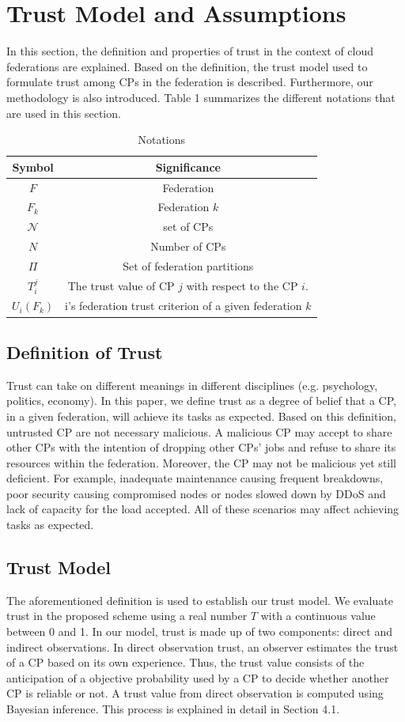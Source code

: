 \documentclass[preprint]{elsarticle}
\theoremstyle{definition}
\theoremstyle{remark}
\theoremstyle{property}
\begin{document}
\section{Trust Model and Assumptions}

In this section, the definition and properties of trust in the context of cloud federations are explained. Based on the definition, the trust model used to formulate trust among CPs in the federation is described. Furthermore, our methodology is also introduced. Table 1 summarizes the different notations that are used in this section.

\begin{table}[!ht]
\caption{Notations}
\centering
\begin{tabular}{|c c|}
\hline
Symbol & Significance \\
\hline
$F$ & Federation \\
$F_{k}$ & Federation $k$\\
$\mathcal{N}$ & set of CPs \\
$N$ & Number of CPs \\
$\Pi$ & Set of federation partitions \\
$T_{i}^{j}$ & The trust value of CP $j$ with respect to the CP $i$.  \\
$U_{i}(F_{k})$ & i's federation trust criterion of a given federation $k$ \\
\hline
\end{tabular}
\end{table}

\subsection{Definition of Trust}
Trust can take on different meanings in different disciplines (e.g. psychology, politics, economy). In this paper, we define trust as a degree of belief that a CP, in a given federation, will achieve its tasks as expected. Based on this definition, untrusted CP are not necessary malicious. A malicious CP may accept to share other CPs with the intention of dropping other CPs’ jobs and refuse to share its resources within the federation. Moreover, the CP may not be malicious yet still deficient. For example, inadequate maintenance causing frequent breakdowns, poor security causing compromised nodes or nodes slowed down by DDoS and lack of capacity for the load accepted. All of these scenarios may affect achieving tasks as expected.

\subsection{Trust Model}
The aforementioned definition is used to establish our trust model.
We evaluate trust in the proposed scheme using a real number
$T$ with a continuous value between 0 and 1. In our model, trust is made up of two components: direct and indirect observations. In direct observation trust,
an observer estimates the trust of a CP based
on its own experience. Thus, the trust value consists of the anticipation
of a objective probability used by a CP to decide whether
another CP is reliable or not. A trust value from direct observation is computed using Bayesian inference. This process is explained in detail in Section 4.1.
\end{document}
